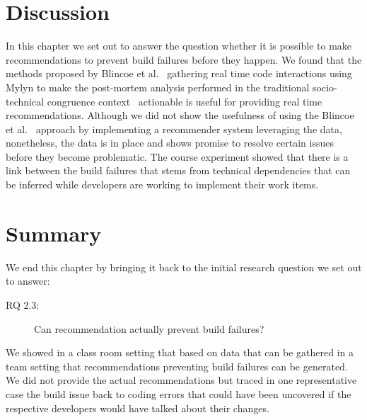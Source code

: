 \section{Discussion}
\label{ch10:dis}
In this chapter we set out to answer the question whether it is possible to make recommendations to prevent build failures before they happen.
We found that the methods proposed by Blincoe et al.~\cite{blincoe:cscw:2012} gathering real time code interactions using Mylyn to make the post-mortem analysis performed in the traditional socio-technical congruence context~\cite{kersten:aosd:2005} actionable is useful for providing real time recommendations.
Although we did not show the usefulness of using the Blincoe et al.~\cite{blincoe:cscw:2012} approach by implementing a recommender system leveraging the data, nonetheless, the data is in place and shows promise to resolve certain issues before they become problematic.
The course experiment showed that there is a link between the build failures that stems from technical dependencies that can be inferred while developers are working to implement their work items.

\section{Summary}
\label{ch10:con}
We end this chapter by bringing it back to the initial research question we set out to answer:
\begin{description}
  \item[RQ 2.3:] Can recommendation actually prevent build failures?
\end{description}

We showed in a class room setting that based on data that can be gathered in a team setting that recommendations preventing build failures can be generated.
We did not provide the actual recommendations but traced in one representative case the build issue back to coding errors that could have been uncovered if the respective developers would have talked about their changes.